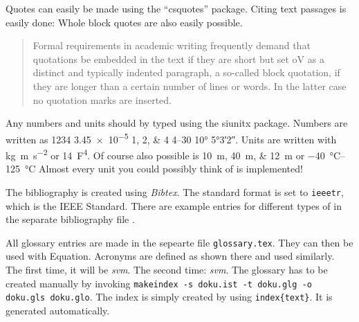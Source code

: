Quotes can easily be made using the \enquote{csquotes} package.
Citing text passages is easily done:  Whole block quotes are also easily 
possible.

\blockquote{Formal requirements in academic writing frequently demand that
quotations be embedded in the text if they are short but set oV as a distinct
and typically indented paragraph, a so-called block quotation, if they are
longer than a certain number of lines or words. In the latter case no quotation
marks are inserted.}

Any numbers and units should by typed using the siunitx package.
Numbers are written as \num{1234} \num{3.45e-5} \numlist{1;2;4} \numrange{4}{30} \ang{10} \ang{5;3;2}.
Units are written with \si{\kilo\gram\meter\per\square\second} or \SI{14}{\farad\tothe{4}}.
Of course also possible is \SIlist{10;40;12}{\meter} or \SIrange{-40}{+125}{\degreeCelsius}
Almost every unit you could possibly think of is implemented!

The bibliography is created using \emph{Bibtex}. The
standard format is set to \texttt{ieeetr}, which is the IEEE Standard. There
are example entries for different types of  in the separate bibliography file
\cite{article} \cite{book} \cite{booklet} \cite{conference} \cite{inbook}
\cite{incollection} \cite{manual} \cite{mastersthesis} \cite{misc}
\cite{phdthesis} \cite{proceedings} \cite{techreport} \cite{unpublished}.

All glossary entries are made in the sepearte file \texttt{glossary.tex}.
They can then be used with \gls{Equation}.
Acronyms are defined as shown there and used similarly. 
The first time, it will be \emph{\gls{svm}}.
The second time: \emph{\gls{svm}}.
The glossary has to be created manually by invoking \texttt{makeindex -s doku.ist -t doku.glg -o doku.gls doku.glo}.
The index is simply created by using \texttt{index\{text\}}. It is generated automatically.